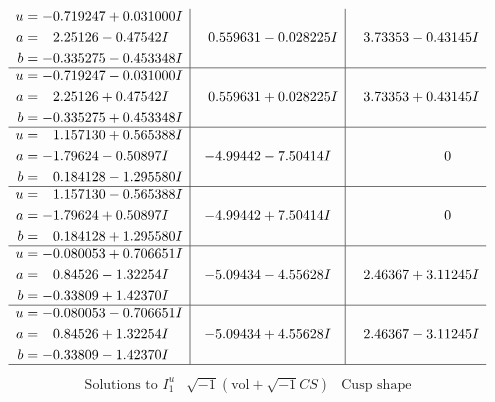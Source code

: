 \documentclass[1p]{elsarticle_modified}
\theoremstyle{definition}
\newcommand{\I}{\sqrt{-1}}
\begin{document}
$$\begin{array}{c|c|c}
\begin{aligned}
u &= -0.719247 + 0.031000 I \\
a &= \phantom{-}2.25126 - 0.47542 I \\
b &= -0.335275 - 0.453348 I\end{aligned}
 & \phantom{-}0.559631 - 0.028225 I & \phantom{-}3.73353 - 0.43145 I \\ \hline\begin{aligned}
u &= -0.719247 - 0.031000 I \\
a &= \phantom{-}2.25126 + 0.47542 I \\
b &= -0.335275 + 0.453348 I\end{aligned}
 & \phantom{-}0.559631 + 0.028225 I & \phantom{-}3.73353 + 0.43145 I \\ \hline\begin{aligned}
u &= \phantom{-}1.157130 + 0.565388 I \\
a &= -1.79624 - 0.50897 I \\
b &= \phantom{-}0.184128 - 1.295580 I\end{aligned}
 & -4.99442 - 7.50414 I & \phantom{-0.000000 } 0 \\ \hline\begin{aligned}
u &= \phantom{-}1.157130 - 0.565388 I \\
a &= -1.79624 + 0.50897 I \\
b &= \phantom{-}0.184128 + 1.295580 I\end{aligned}
 & -4.99442 + 7.50414 I & \phantom{-0.000000 } 0 \\ \hline\begin{aligned}
u &= -0.080053 + 0.706651 I \\
a &= \phantom{-}0.84526 - 1.32254 I \\
b &= -0.33809 + 1.42370 I\end{aligned}
 & -5.09434 - 4.55628 I & \phantom{-}2.46367 + 3.11245 I \\ \hline\begin{aligned}
u &= -0.080053 - 0.706651 I \\
a &= \phantom{-}0.84526 + 1.32254 I \\
b &= -0.33809 - 1.42370 I\end{aligned}
 & -5.09434 + 4.55628 I & \phantom{-}2.46367 - 3.11245 I\\
 \hline 
 \end{array}$$\newpage$$\begin{array}{c|c|c}  
\text{Solutions to }I^u_{1}& \I (\text{vol} + \sqrt{-1}CS) & \text{Cusp shape}\\
 \hline 
\begin{aligned}

\end{aligned}
\end{array}$$
\end{document}
